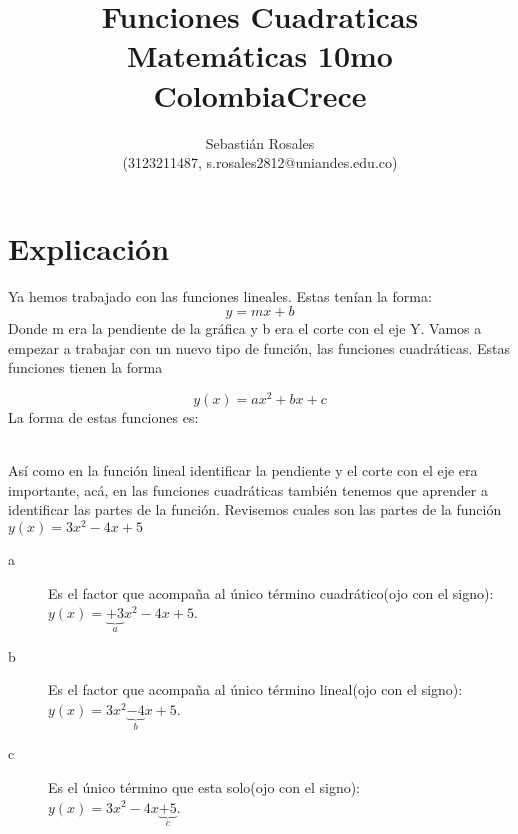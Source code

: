 \documentclass{article}
\title{Funciones Cuadraticas \\\small{Matem\'aticas 10mo}\\\small{ColombiaCrece}}
\author{Sebasti\'an Rosales \\(3123211487, s.rosales2812@uniandes.edu.co)}
\begin{document}
\maketitle
\section{Explicaci\'on}
Ya hemos trabajado con las funciones lineales. Estas ten\'ian la forma:
\[y=mx+b\]
Donde m era la pendiente de la gr\'afica y b era el corte con el eje Y. 
Vamos a empezar a trabajar con un nuevo tipo de funci\'on, las funciones cuadr\'aticas. Estas funciones tienen la forma

\textbf{\[y(x)=ax^{2}+bx+c\]}
La forma de estas funciones es: \\
\\




As\'i como en la funci\'on lineal identificar la pendiente y el corte con el eje era importante, ac\'a, en las funciones cuadr\'aticas tambi\'en tenemos que aprender a identificar las partes de la funci\'on. Revisemos cuales son las partes de la funci\'on $y(x)=3x^2-4x+5$ 
\begin{description}
\item[a] Es el factor que acompa\~na al \'unico  t\'ermino cuadr\'atico(ojo con el signo):\\ $y(x)=\underbrace{+3}_a x^{2}-4x+5$.
\item[b] Es el factor que acompa\~na al \'unico  t\'ermino lineal(ojo con el signo): \\$y(x)=3x^{2}\underbrace{-4}_bx+5$.
\item[c] Es el \'unico t\'ermino que esta solo(ojo con el signo): \\$y(x)=3x^{2}-4x\underbrace{+5}_c$.
\end{description}
\end{document}
